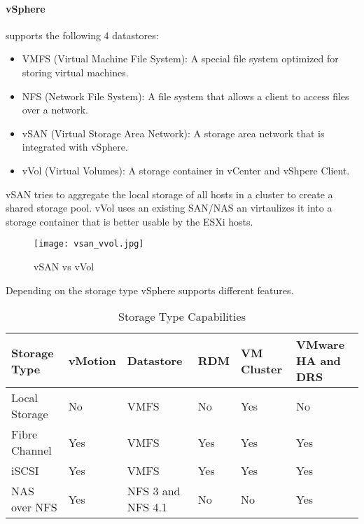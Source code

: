 \paragraph{vSphere} supports the following 4 datastores:

\begin{itemize}
    \item VMFS (Virtual Machine File System): A special file system optimized for storing virtual machines.
    \item NFS (Network File System): A file system that allows a client to access files over a network.
    \item vSAN (Virtual Storage Area Network): A storage area network that is integrated with vSphere.
    \item vVol (Virtual Volumes): A storage container in vCenter and vShpere Client.
\end{itemize}

vSAN tries to aggregate the local storage of all hosts in a cluster to create a shared storage pool. vVol uses an existing SAN/NAS an virtaulizes it into a storage container that is better usable by the ESXi hosts.

\begin{figure}[H]
    \centering
	\texttt{[image: vsan\_vvol.jpg]} %
	\caption{vSAN vs vVol} %
	\label{fig:vSAN_vs_vVol} %
\end{figure}

Depending on the storage type vSphere supports different features.

\begin{table}[h!]
    \centering
    \caption{Storage Type Capabilities}
    \begin{tabular}{|l|l|l|l|l|l|}
    \hline
    \textbf{Storage Type} & \textbf{vMotion} & \textbf{Datastore} & \textbf{RDM} & \textbf{VM Cluster} & \textbf{VMware HA and DRS} \\ \hline
    Local Storage         & No               & VMFS                & No          & Yes                & No                          \\ \hline
    Fibre Channel         & Yes              & VMFS                & Yes         & Yes                & Yes                         \\ \hline
    iSCSI                 & Yes              & VMFS                & Yes         & Yes                & Yes                         \\ \hline
    NAS over NFS          & Yes              & NFS 3 and NFS 4.1   & No          & No                 & Yes                         \\ \hline
    \end{tabular}
\end{table}
